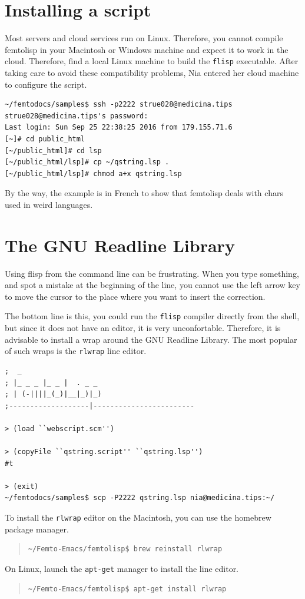 \documentclass[a4paper,12pt]{book}
\begin{document}
\section{Installing a script}
Most servers and cloud services run on Linux.
Therefore, you cannot compile femtolisp in
your Macintosh or Windows machine and expect it
to work in the cloud. Therefore, find a local
Linux machine to build the \verb|flisp| executable.
After taking care to avoid these compatibility
problems, Nia entered her cloud machine to
configure the script.
\begin{Verbatim}[fontsize=\small,
frame=single,
framerule=0.5mm]
~/femtodocs/samples$ ssh -p2222 strue028@medicina.tips
strue028@medicina.tips's password:
Last login: Sun Sep 25 22:38:25 2016 from 179.155.71.6
[~]# cd public_html
[~/public_html]# cd lsp
[~/public_html/lsp]# cp ~/qstring.lsp .
[~/public_html/lsp]# chmod a+x qstring.lsp
\end{Verbatim}

By the way, the example is in French to show
that femtolisp deals with chars used in
weird languages.

\section{The GNU Readline Library}
Using flisp from the command line can be frustrating.
When you type something, and spot a mistake at the
beginning of the line, you cannot use the
\keys{$\leftarrow$} left arrow key to move
the cursor to the place where you want to
insert the correction. 


The bottom line is this, you could
run the \verb|flisp| compiler directly
from the shell, but since it does not
have an editor, it is very unconfortable.
Therefore, it is advisable to install
a wrap around the GNU Readline Library.
The most popular of such wraps
is the \verb|rlwrap| line editor.


\begin{Verbatim}[fontsize=\small,
frame=single,
framerule=0.5mm]
;  _
; |_ _ _ |_ _ |  . _ _
; | (-||||_(_)|__|_)|_)
;-------------------|------------------------

> (load ``webscript.scm'')

> (copyFile ``qstring.script'' ``qstring.lsp'')
#t

> (exit)
~/femtodocs/samples$ scp -P2222 qstring.lsp nia@medicina.tips:~/
\end{Verbatim}


To install the \verb|rlwrap| editor
on the Macintosh, you can use the
homebrew package manager.
\begin{quote}
\begin{verbatim}
~/Femto-Emacs/femtolisp$ brew reinstall rlwrap
\end{verbatim}
\end{quote}
On Linux, launch the \verb|apt-get|
manager to install the line editor.
\begin{quote}
\begin{verbatim}
~/Femto-Emacs/femtolisp$ apt-get install rlwrap
\end{verbatim}
\end{quote}
\end{document}
